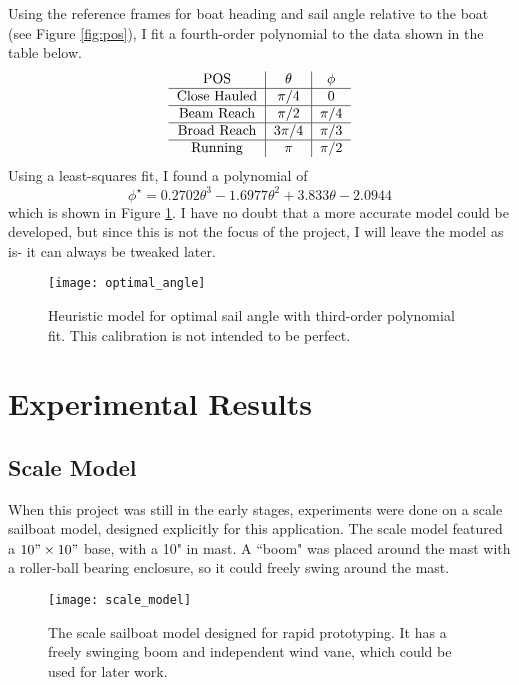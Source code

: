 \documentclass[letterpaper, 10 pt, conference]{ieeeconf}  %
\begin{document}

Using the reference frames for boat heading and sail angle relative to the boat (see Figure \ref{fig:pos}), I fit a fourth-order polynomial to the data shown in the table below.
\[
\begin{tabular}{c|c|c}
POS & $\theta$ & $\phi$ \\\hline 
Close Hauled & $\pi/4$ & 0 \\\hline 
Beam Reach & $\pi/2$ & $\pi/4$ \\\hline 
Broad Reach & $3\pi/4$ & $\pi/3$\\\hline 
Running & $\pi$ & $\pi/2$\end{tabular}
\]
Using a least-squares fit, I found a polynomial of 
\[
\phi^\star = 0.2702 \theta^3 -1.6977 \theta^2 + 3.833 \theta  -2.0944 
\]
which is shown in Figure \ref{fig:optimal}. I have no doubt that a more accurate model could be developed, but since this is not the focus of the project, I will leave the model as is- it can always be tweaked later. 
\begin{figure}[htbp]
   \centering
   \texttt{[image: optimal\_angle]} %
   \caption{Heuristic model for optimal sail angle with third-order polynomial fit. This calibration is not intended to be perfect.} 
   \label{fig:optimal}
\end{figure}

\section{Experimental Results}
\subsection{Scale Model}
\label{sec:scale}
When this project was still in the early stages, experiments were done on a scale sailboat model, designed explicitly for this application. The scale model featured a $10"\times 10"$ base, with a  10" in mast. A ``boom" was placed around the mast with a roller-ball bearing enclosure, so it could freely swing around the mast. 
\begin{figure}[htbp]
  \centering
   \texttt{[image: scale\_model]} 
  \caption{The scale sailboat model designed for rapid prototyping. It has a freely swinging boom and independent wind vane, which could be used for later work.}
   \label{fig:scale}
\end{figure}
\end{document}
